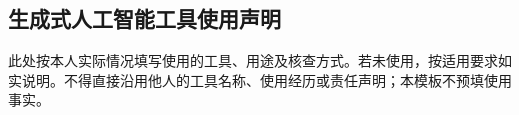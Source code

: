 \subsection*{生成式人工智能工具使用声明}
{}
此处按本人实际情况填写使用的工具、用途及核查方式。若未使用，按适用要求如实说明。不得直接沿用他人的工具名称、使用经历或责任声明；本模板不预填使用事实。
